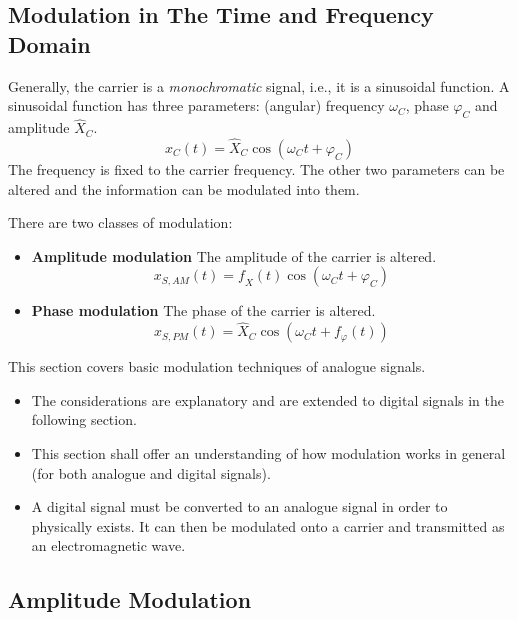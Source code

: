 \begin{refsection}

\section{Modulation in The Time and Frequency Domain}

Generally, the carrier is a \emph{monochromatic} signal, i.e., it is a sinusoidal function. A sinusoidal function has three parameters: (angular) frequency $\omega_C$, phase $\varphi_C$ and amplitude $\hat{X}_C$.
\begin{equation}
	x_C(t) = \hat{X}_C \cos\left(\omega_C t + \varphi_C\right)
	\label{eq:ch05:carrier_timedomain}
\end{equation}
The frequency is fixed to the carrier frequency. The other two parameters can be altered and the information can be modulated into them.

There are two classes of modulation:
\begin{itemize}
	\item \textbf{Amplitude modulation} The amplitude of the carrier is altered.
	\begin{equation}
		x_{S,AM}(t) = f_{\hat{X}}(t) \cos\left(\omega_C t + \varphi_C\right)
	\end{equation}
	\item \textbf{Phase modulation} The phase of the carrier is altered.
	\begin{equation}
		x_{S,PM}(t) = \hat{X}_C \cos\left(\omega_C t + f_{\varphi}(t)\right)
	\end{equation}
\end{itemize}

This section covers basic modulation techniques of analogue signals.
\begin{itemize}
	\item The considerations are explanatory and are extended to digital signals in the following section.
	\item This section shall offer an understanding of how modulation works in general (for both analogue and digital signals).
	\item A digital signal must be converted to an analogue signal in order to physically exists. It can then be modulated onto a carrier and transmitted as an electromagnetic wave.
\end{itemize}

\subsection{Amplitude Modulation}


\end{refsection}
